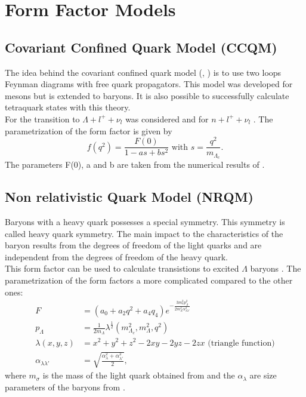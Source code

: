 \section{Form Factor Models}
\subsection{Covariant Confined Quark Model (CCQM)}
The idea behind the covariant confined quark model 
({\cite{CCQM_N}}, {\cite{CCQM_L}}) is to use two loops 
Feynman diagrams with free quark propagators. This model was developed for mesons but 
is extended to baryons. It is also possible to successfully calculate tetraquark 
states with this theory.\\
For the transition to \(\Lambda + l^+ + \nu_l\) {\cite{CCQM_L}} was 
considered and for \(n + l^+ + \nu_l\) {\cite{CCQM_N}}.
The parametrization of the form factor is given by
\begin{equation}
  f(q^2) = \frac{F(0)}{1 - a s + b s^2} \text{ with } s = \frac{q^2}{m_{\Lambda_c}} \label{eq:ccqmff}.
\end{equation}
The parameters F(0), a and b are taken from the numerical results of {\cite{CCQM_L}}.

\subsection{Non relativistic Quark Model (NRQM)}
Baryons with a heavy quark possesses a special symmetry. This symmetry is 
called heavy quark symmetry. The main impact to the characteristics of the baryon results from the degrees of freedom of the 
light quarks and are independent from the degrees of freedom of the heavy quark.\\
This form factor {\cite{NRQM}} can be used to calculate transistions to excited \(\Lambda\)
baryons {\cite{NRQM}}. The parametrization of the form factors a more complicated compared 
to the other ones:
\begin{align}
  F &= \left(a_0 + a_2 q^2 + a_4 q_4\right) e^{- \frac{3 m_\sigma^2 p_\Lambda^2}
  {2 m_\Lambda^2 \alpha_{\lambda \lambda'}^2} } \nonumber\\
  p_\Lambda & = \frac{1}{2 m_\Lambda}  \lambda^\frac{1}{2}(m_{\Lambda_c}^2, m_\Lambda^2, q^2) \nonumber \\
  \lambda(x, y, z) & = x^2 + y^2 + z^2 - 2xy - 2yz - 2zx \text{ (triangle function)} \nonumber \\
  \alpha_{\lambda \lambda'} & = \sqrt{\frac{\alpha_\lambda^2 + \alpha_{\lambda'}^2 }{2}}, \label{eq:nrqmff}
\end{align}
where \(m_\sigma\) is the mass of the light quark obtained from 
{\cite[p. 13/I]{NRQM}} and the \(\alpha_\lambda\) are size parameters of 
the baryons from {\cite[p. 13/II]{NRQM}}.

